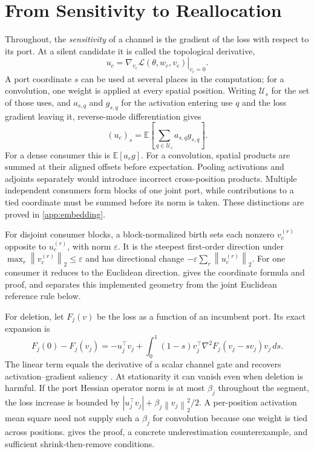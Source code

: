 \documentclass[10pt]{article}
\theoremstyle{paper}
\newcommand{\E}{\mathbb E}
\newcommand{\Lcal}{\mathcal L}
\newcommand{\norm}[1]{\left\lVert #1\right\rVert}
\begin{document}
\section{From Sensitivity to Reallocation}
\label{sec:theory}
Throughout, the \emph{sensitivity} of a channel is the gradient of the loss with respect to its port. At a silent candidate it is called the topological derivative,
\begin{equation}
u_c=\left.\nabla_{v_c}\Lcal(\theta,w_c,v_c)\right|_{v_c=0}.
\label{eq:derivative}
\end{equation}
A port coordinate $s$ can be used at several places in the computation; for a convolution, one weight is applied at every spatial position. Writing $\mathcal U_s$ for the set of those uses, and $a_{s,q}$ and $g_{s,q}$ for the activation entering use $q$ and the loss gradient leaving it, reverse-mode differentiation gives
\begin{equation}
(u_c)_s=\E\!\left[\sum_{q\in\mathcal U_s}a_{s,q}g_{s,q}\right].
\label{eq:main-port-uses}
\end{equation}
For a dense consumer this is $\E[a_cg]$. For a convolution, spatial products are summed at their aligned offsets before expectation. Pooling activations and adjoints separately would introduce incorrect cross-position products. Multiple independent consumers form blocks of one joint port, while contributions to a tied coordinate must be summed before its norm is taken. These distinctions are proved in \cref{app:embedding}.

For disjoint consumer blocks, a block-normalized birth sets each nonzero $v_c^{(r)}$ opposite to $u_c^{(r)}$, with norm $\varepsilon$. It is the steepest first-order direction under $\max_r\norm{v_c^{(r)}}_2\le\varepsilon$ and has directional change $-\varepsilon\sum_r\norm{u_c^{(r)}}_2$. For one consumer it reduces to the Euclidean direction.  gives the coordinate formula and proof, and separates this implemented geometry from the joint Euclidean reference rule below.

For deletion, let $F_j(v)$ be the loss as a function of an incumbent port. Its exact expansion is
\begin{equation}
F_j(0)-F_j(v_j)=-u_j^\top v_j+
\int_0^1(1-s)v_j^\top\nabla^2F_j(v_j-sv_j)v_j\,ds.
\label{eq:main-removal-expansion}
\end{equation}
The linear term equals the derivative of a scalar channel gate and recovers activation--gradient saliency \citep{molchanov2017pruning}. At stationarity it can vanish even when deletion is harmful. If the port Hessian operator norm is at most $\beta_j$ throughout the segment, the loss increase is bounded by $|u_j^\top v_j|+\beta_j\norm{v_j}_2^2/2$. A per-position activation mean square need not supply such a $\beta_j$ for convolution because one weight is tied across positions.  gives the proof, a concrete underestimation counterexample, and sufficient shrink-then-remove conditions.
\end{document}
